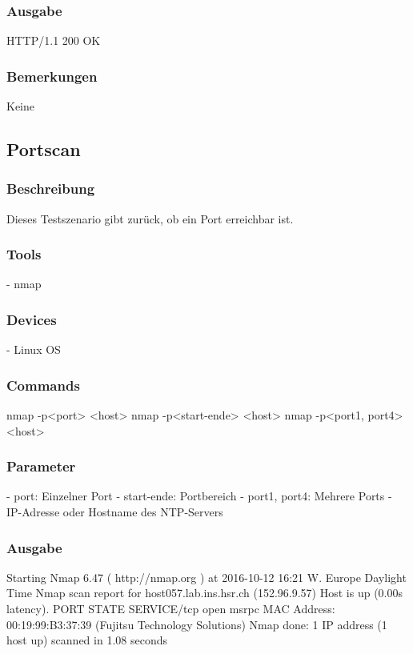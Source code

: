 \documentclass[a4,12pt]{scrartcl}
\begin{document}
\subsubsection{Ausgabe}
HTTP/1.1 200 OK
\subsubsection{Bemerkungen}
Keine

\subsection{Portscan}
\subsubsection{Beschreibung}
Dieses Testszenario gibt zurück, ob ein Port erreichbar ist.
\subsubsection{Tools}
- nmap
\subsubsection{Devices}
- Linux OS
\subsubsection{Commands}
nmap -p<port> <host>
nmap -p<start-ende> <host>
nmap -p<port1, port4> <host>
\subsubsection{Parameter}
- port: Einzelner Port
- start-ende: Portbereich
- port1, port4: Mehrere Ports
- IP-Adresse oder Hostname des NTP-Servers
\subsubsection{Ausgabe}
Starting Nmap 6.47 ( http://nmap.org ) at 2016-10-12 16:21 W. Europe Daylight Time\newline
Nmap scan report for host057.lab.ins.hsr.ch (152.96.9.57)\newline
Host is up (0.00s latency).\newline
PORT    STATE SERVICE/tcp open  msrpc\newline
MAC Address: 00:19:99:B3:37:39 (Fujitsu Technology Solutions)\newline
Nmap done: 1 IP address (1 host up) scanned in 1.08 seconds\newline
\end{document}
